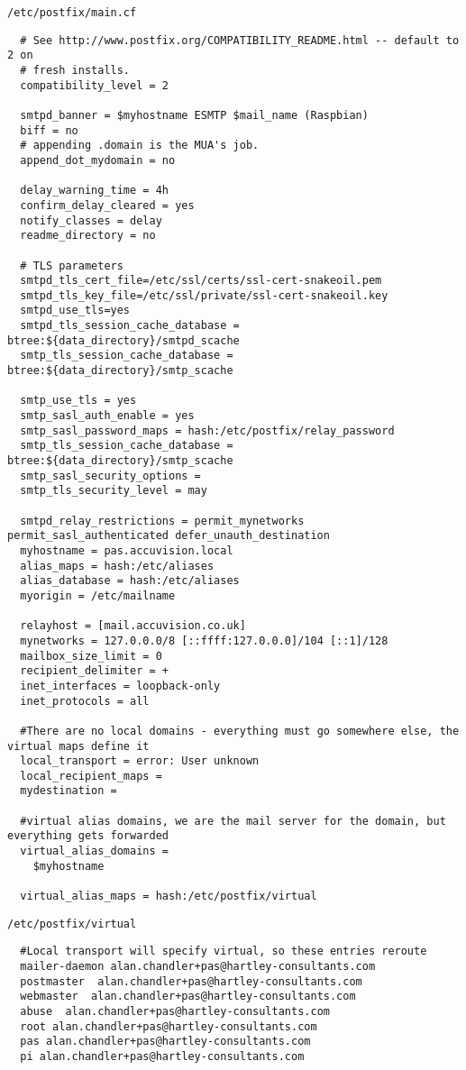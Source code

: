 \documentclass[Draft]{akc}
\begin{document}
\texttt{/etc/postfix/main.cf}
\begin{lstlisting}
  # See http://www.postfix.org/COMPATIBILITY_README.html -- default to 2 on
  # fresh installs.
  compatibility_level = 2

  smtpd_banner = $myhostname ESMTP $mail_name (Raspbian)
  biff = no
  # appending .domain is the MUA's job.
  append_dot_mydomain = no

  delay_warning_time = 4h
  confirm_delay_cleared = yes
  notify_classes = delay
  readme_directory = no

  # TLS parameters
  smtpd_tls_cert_file=/etc/ssl/certs/ssl-cert-snakeoil.pem
  smtpd_tls_key_file=/etc/ssl/private/ssl-cert-snakeoil.key
  smtpd_use_tls=yes
  smtpd_tls_session_cache_database = btree:${data_directory}/smtpd_scache
  smtp_tls_session_cache_database = btree:${data_directory}/smtp_scache

  smtp_use_tls = yes
  smtp_sasl_auth_enable = yes
  smtp_sasl_password_maps = hash:/etc/postfix/relay_password
  smtp_tls_session_cache_database = btree:${data_directory}/smtp_scache
  smtp_sasl_security_options =
  smtp_tls_security_level = may

  smtpd_relay_restrictions = permit_mynetworks permit_sasl_authenticated defer_unauth_destination
  myhostname = pas.accuvision.local
  alias_maps = hash:/etc/aliases
  alias_database = hash:/etc/aliases
  myorigin = /etc/mailname

  relayhost = [mail.accuvision.co.uk]
  mynetworks = 127.0.0.0/8 [::ffff:127.0.0.0]/104 [::1]/128
  mailbox_size_limit = 0
  recipient_delimiter = +
  inet_interfaces = loopback-only
  inet_protocols = all

  #There are no local domains - everything must go somewhere else, the virtual maps define it
  local_transport = error: User unknown
  local_recipient_maps =
  mydestination =

  #virtual alias domains, we are the mail server for the domain, but everything gets forwarded
  virtual_alias_domains =
    $myhostname

  virtual_alias_maps = hash:/etc/postfix/virtual
\end{lstlisting}

\texttt{/etc/postfix/virtual}

\begin{lstlisting}
  #Local transport will specify virtual, so these entries reroute
  mailer-daemon alan.chandler+pas@hartley-consultants.com
  postmaster  alan.chandler+pas@hartley-consultants.com
  webmaster  alan.chandler+pas@hartley-consultants.com
  abuse  alan.chandler+pas@hartley-consultants.com
  root alan.chandler+pas@hartley-consultants.com
  pas alan.chandler+pas@hartley-consultants.com
  pi alan.chandler+pas@hartley-consultants.com

\end{lstlisting}
\end{document}
